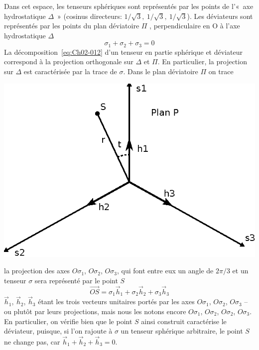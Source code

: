 Dans cet espace, les tenseurs sphériques sont représentés par les points de l'«~axe hydrostatique $\Delta$~» (cosinus directeurs: $1/\sqrt{3},\ 1/\sqrt{3},\ 1/\sqrt{3}$).
Les déviateurs sont représentés par les points du plan déviatoire $\Pi$ , perpendiculaire en O à l'axe hydrostatique $\Delta$
\begin{equation}
    \sigma_1 + \sigma_2 + \sigma_3 = 0
    \label{eq:Ch02-027}
\end{equation}
La décomposition~\eqref{eq:Ch02-012} d'un tenseur en partie sphérique et déviateur correspond à la projection orthogonale sur $\Delta$ et $\Pi$.
En particulier, la projection sur $\Delta$ est caractérisée par la trace de $\mathbb{\sigma}$.
Dans le plan déviatoire $\Pi$ on trace 
\begin{center}
    \includegraphics{../images/T1_Ch02-0013}
\end{center}
la projection des axes $O\sigma_1$, $O\sigma_2$, $O\sigma_3$, qui font entre eux un angle de $2\pi/3$ et un tenseur $\mathbb{\sigma}$ sera représenté par le point $S$
\begin{equation}
    \vec{OS} = \sigma_1 \vec{h}_1 + \sigma_2 \vec{h}_2 + \sigma_3 \vec{h}_3
    \label{eq:Ch02-028}
\end{equation}
$\vec{h}_1$, $\vec{h}_2$, $\vec{h}_3$ étant les trois vecteurs unitaires portés par les axes $O\sigma_1$, $O\sigma_2$, $O\sigma_3$ -- ou plutôt par leurs projections, mais nous les notons encore $O\sigma_1$, $O\sigma_2$, $O\sigma_2$, $O\sigma_3$.
En particulier, on vérifie bien que le point $S$ ainsi construit caractérise le déviateur, puisque, si l'on rajoute à $\mathbb{\sigma}$ un tenseur sphérique arbitraire, le point $S$ ne change pas, car $\vec{h}_1 + \vec{h}_2 + \vec{h}_3 = 0$.

